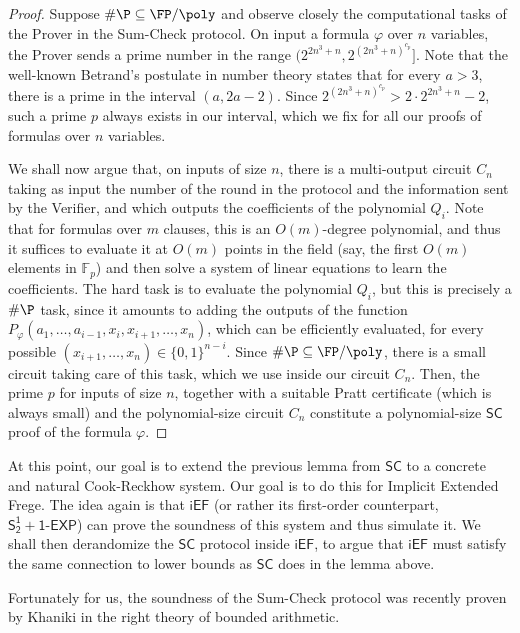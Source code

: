 \documentclass[11pt]{article}
\newcommand{\SOTEXP}{\mathsf{S^1_2} + \mathsf{1\textsf{-}EXP}}
\newcommand{\iEF}{\mathsf{iEF}}
\renewcommand{\SC}{\mathsf{SC}}
\theoremstyle{definition}
\theoremstyle{plain}
\theoremstyle{remark}
\begin{document}
\begin{proof}
    Suppose $\#\P \subseteq \FP/\poly$ and observe closely the computational tasks of the Prover in the Sum-Check protocol. On input a formula $\varphi$ over $n$ variables, the Prover sends a prime number in the range $(2^{2n^3 + n}, 2^{{(2n^3+n)}^{c_p}}]$. Note that the well-known Betrand's postulate in number theory states that for every $a > 3$, there is a prime in the interval $(a, 2a-2)$. Since $2^{{(2n^3+n)}^{c_p}} > 2 \cdot 2^{2n^3 + n} - 2$, such a prime $p$ always exists in our interval, which we fix for all our proofs of formulas over $n$ variables.
    
    We shall now argue that, on inputs of size $n$, there is a multi-output circuit $C_n$ taking as input the number of the round in the protocol and the information sent by the Verifier, and which outputs the coefficients of the polynomial $Q_i$. Note that for formulas over $m$ clauses, this is an $O(m)$-degree polynomial, and thus it suffices to evaluate it at $O(m)$ points in the field (say, the first $O(m)$ elements in $\mathbb{F}_p$) and then solve a system of linear equations to learn the coefficients. The hard task is to evaluate the polynomial $Q_i$, but this is precisely a $\#\P$ task, since it amounts to adding the outputs of the function $P_\varphi(a_1, \dots, a_{i-1}, x_i, x_{i+1}, \dots, x_n)$, which can be efficiently evaluated, for every possible $(x_{i+1}, \dots, x_n) \in \{0,1\}^{n-i}$. Since $\#\P \subseteq \FP/\poly$, there is a small circuit taking care of this task, which we use inside our circuit $C_n$. Then, the prime $p$ for inputs of size $n$, together with a suitable Pratt certificate (which is always small) and the polynomial-size circuit $C_n$ constitute a polynomial-size $\SC$ proof of the formula $\varphi$. 
\end{proof}

At this point, our goal is to extend the previous lemma from $\SC$ to a concrete and natural Cook-Reckhow system. Our goal is to do this for Implicit Extended Frege. The idea again is that $\iEF$ (or rather its first-order counterpart, $\SOTEXP$) can prove the soundness of this system and thus simulate it. We shall then derandomize the $\SC$ protocol inside $\iEF$, to argue that $\iEF$ must satisfy the same connection to lower bounds as $\SC$ does in the lemma above.

Fortunately for us, the soundness of the Sum-Check protocol was recently proven by Khaniki in the right theory of bounded arithmetic.
\end{document}
